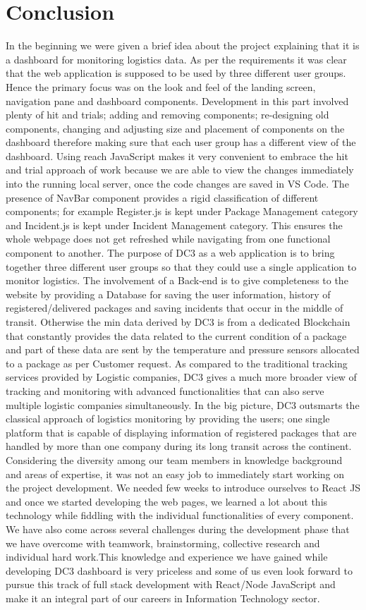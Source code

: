 \chapter{Conclusion}
\label{cha:conclusion}

In the beginning we were given a brief idea about the project explaining that it is a dashboard for monitoring logistics data. As per the requirements it was clear that the web application is supposed to be used by three different user groups. Hence the primary focus was on the look and feel of the landing screen, navigation pane and dashboard components. Development in this part involved plenty of hit and trials; adding and removing components; re-designing old components, changing and adjusting size and placement of components on the dashboard therefore making sure that each user group has a different view of the dashboard. Using reach JavaScript makes it very convenient to embrace the hit and trial approach of work because we are able to view the changes immediately into the running local server, once the code changes are saved in VS Code. The presence of NavBar component provides a rigid classification of different components; for example Register.js is kept under Package Management category and Incident.js is kept under Incident Management category. This ensures the whole webpage does not get refreshed while navigating from one functional component to another. The purpose of DC3 as a web application is to bring together three different user groups so that they could use a single application to monitor logistics. The involvement of a Back-end is to give completeness to the website by providing a Database for saving the user information, history of registered/delivered packages and saving incidents that occur in the middle of transit. Otherwise the min data derived by DC3 is from a dedicated Blockchain that constantly provides the data related to the current condition of a package and part of these data are sent by the temperature and pressure sensors allocated to a package as per Customer request. As compared to the traditional tracking services provided by Logistic companies, DC3 gives a much more broader view of tracking and monitoring with advanced functionalities that can also serve multiple logistic companies simultaneously. In the big picture, DC3 outsmarts the classical approach of logistics monitoring by providing the users; one single platform that is capable of displaying information of registered packages that are handled by more than one company during its long transit across the continent. Considering the diversity among our team members in knowledge background and areas of expertise, it was not an easy job to immediately start working on the project development. We needed few weeks to introduce ourselves to React JS and once we started developing the web pages, we learned a lot about this technology while fiddling with the individual functionalities of every component. We have also come across several challenges during the development phase that we have overcome with teamwork, brainstorming, collective research and individual hard work.This knowledge and experience we have gained while developing DC3 dashboard is very priceless and some of us even look forward to pursue this track of full stack development with React/Node JavaScript and make it an integral part of our careers in Information Technology sector. 

